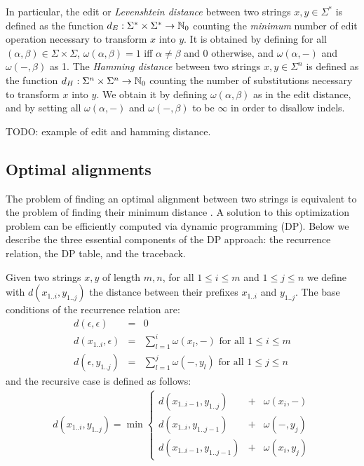 In particular, the edit or \emph{Levenshtein distance} between two strings $x,y \in \Sigma^{*}$ is defined as the function $d_E : \Sigma^{*} \times \Sigma^{*} \rightarrow \mathbb {N}_0$ counting the \emph{minimum} number of edit operation necessary to transform $x$ into $y$.
It is obtained by defining for all $(\alpha,\beta) \in \Sigma \times \Sigma$, $\omega(\alpha,\beta) = 1$ iff $\alpha \neq \beta$ and 0 otherwise, and $\omega(\alpha,-)$ and $\omega(-,\beta)$ as 1.
The \emph{Hamming distance} between two strings $x,y \in \Sigma^{n}$ is defined as the function $d_H : \Sigma^{n} \times \Sigma^{n} \rightarrow \mathbb {N}_0$ counting the number of substitutions necessary to transform $x$ into $y$.
We obtain it by defining $\omega(\alpha,\beta)$ as in the edit distance, and by setting all $\omega(\alpha,-)$ and $\omega(-,\beta)$ to be $\infty$ in order to disallow indels.

\begin{example}
TODO: example of edit and hamming distance.
\end{example}

\subsection{Optimal alignments}

The problem of finding an optimal alignment between two strings is equivalent to the problem of finding their minimum distance \citep{Gusfield1997}.
A solution to this optimization problem can be efficiently computed via dynamic programming (DP).
Below we describe the three essential components of the DP approach: the recurrence relation, the DP table, and the traceback.

Given two strings $x,y$ of length $m,n$, for all $1 \leq i \leq m$ and $1 \leq j \leq n$ we define with $d(x_{1..i},y_{1..j})$ the distance between their prefixes $x_{1..i}$ and $y_{1..j}$.
The base conditions of the recurrence relation are:
\begin{eqnarray}
d(\epsilon,\epsilon)&=&0\\
d(x_{1..i},\epsilon)&=&\sum_{l=1}^{i}{\omega(x_l, -)} \text{ for all } 1 \leq i \leq m\\
d(\epsilon, y_{1..j})&=&\sum_{l=1}^{j}{\omega(-, y_l)} \text{ for all } 1 \leq j \leq n
\end{eqnarray}
and the recursive case is defined as follows:
\begin{eqnarray}
d(x_{1..i},y_{1..j}) = \min \left\{
\begin{array}{lcl}
d(x_{1..i-1},y_{1..j})&+&\omega(x_i, -)\\
d(x_{1..i},y_{1..j-1})&+&\omega(-, y_j)\\
d(x_{1..i-1},y_{1..j-1})&+&\omega(x_i, y_j)
\end{array}
\right.\label{eq:dp-min}
\end{eqnarray}

